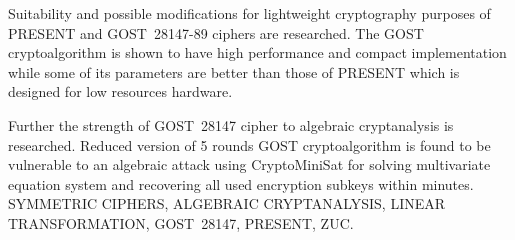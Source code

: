     Suitability and possible modifications for lightweight cryptography purposes of
    PRESENT and GOST~28147-89 ciphers are researched. The GOST cryptoalgorithm is
    shown to have high performance and compact implementation while some of its
    parameters are better than those of PRESENT which is designed for low resources
    hardware.

    Further the strength of GOST~28147 cipher to algebraic cryptanalysis is
    researched. Reduced version of 5 rounds GOST cryptoalgorithm is found to be
    vulnerable to an algebraic attack using CryptoMiniSat for solving multivariate
    equation system and recovering all used encryption subkeys within minutes. \\[1em]

    SYMMETRIC CIPHERS, ALGEBRAIC CRYPTANALYSIS, LINEAR TRANSFORMATION, GOST~28147, 
    PRESENT, ZUC.
\newpage
